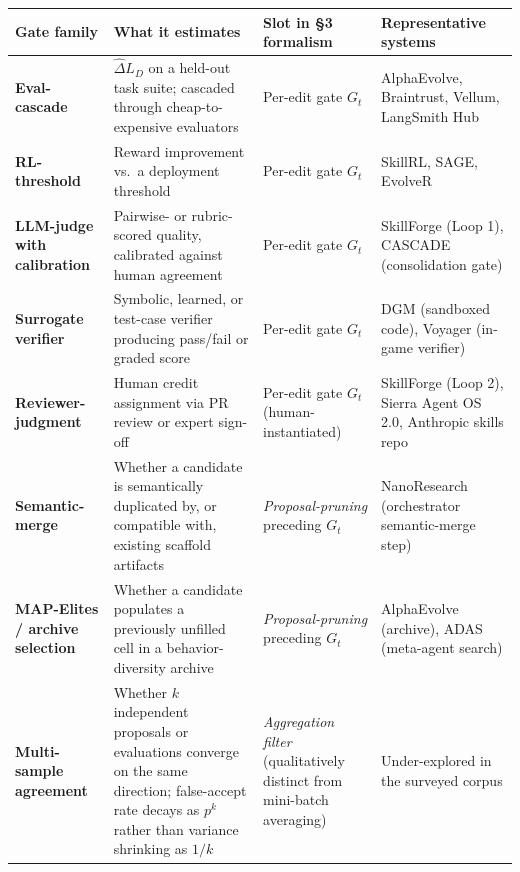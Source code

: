 {\def\LTcaptype{none} %
\begin{longtable}[]{@{}
  >{\raggedright\arraybackslash}p{}
  >{\raggedright\arraybackslash}p{}
  >{\raggedright\arraybackslash}p{}
  >{\raggedright\arraybackslash}p{}@{}}
\toprule\noalign{}
\begin{minipage}[b]{\linewidth}\raggedright
Gate family
\end{minipage} & \begin{minipage}[b]{\linewidth}\raggedright
What it estimates
\end{minipage} & \begin{minipage}[b]{\linewidth}\raggedright
Slot in §3 formalism
\end{minipage} & \begin{minipage}[b]{\linewidth}\raggedright
Representative systems
\end{minipage} \\
\midrule\noalign{}
\endhead
\bottomrule\noalign{}
\endlastfoot
\textbf{Eval-cascade} & \(\widehat{\Delta} L_D\) on a held-out task
suite; cascaded through cheap-to-expensive evaluators & Per-edit gate
\(G_t\) & AlphaEvolve, Braintrust, Vellum, LangSmith Hub \\
\textbf{RL-threshold} & Reward improvement vs.~a deployment threshold &
Per-edit gate \(G_t\) & SkillRL, SAGE, EvolveR \\
\textbf{LLM-judge with calibration} & Pairwise- or rubric-scored
quality, calibrated against human agreement & Per-edit gate \(G_t\) &
SkillForge (Loop 1), CASCADE (consolidation gate) \\
\textbf{Surrogate verifier} & Symbolic, learned, or test-case verifier
producing pass/fail or graded score & Per-edit gate \(G_t\) & DGM
(sandboxed code), Voyager (in-game verifier) \\
\textbf{Reviewer-judgment} & Human credit assignment via PR review or
expert sign-off & Per-edit gate \(G_t\) (human-instantiated) &
SkillForge (Loop 2), Sierra Agent OS 2.0, Anthropic skills repo \\
\textbf{Semantic-merge} & Whether a candidate is semantically duplicated
by, or compatible with, existing scaffold artifacts &
\emph{Proposal-pruning} preceding \(G_t\) & NanoResearch (orchestrator
semantic-merge step) \\
\textbf{MAP-Elites / archive selection} & Whether a candidate populates
a previously unfilled cell in a behavior-diversity archive &
\emph{Proposal-pruning} preceding \(G_t\) & AlphaEvolve (archive), ADAS
(meta-agent search) \\
\textbf{Multi-sample agreement} & Whether \(k\) independent proposals or
evaluations converge on the same direction; false-accept rate decays as
\(p^k\) rather than variance shrinking as \(1/k\) & \emph{Aggregation
filter} (qualitatively distinct from mini-batch averaging) &
Under-explored in the surveyed corpus \\
\end{longtable}
}


